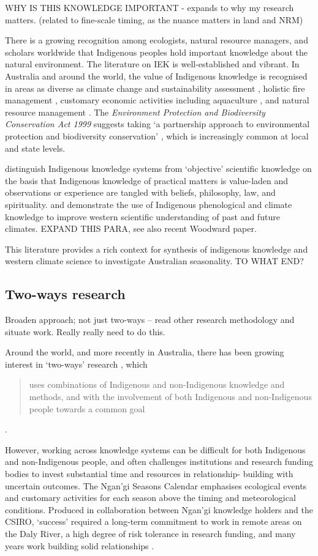 WHY IS THIS KNOWLEDGE IMPORTANT - expands to why my research matters.
(related to fine-scale timing, as the nuance matters in land and NRM)

There is a growing recognition among ecologists, natural resource managers, and
scholars worldwide that Indigenous peoples hold important knowledge about the
natural environment. The literature on IEK is well-established and vibrant.  In
Australia and around the world, the value of Indigenous knowledge is recognised
in areas as diverse as climate change and sustainability assessment
\citep[eg.][]{cochran2015}, holistic fire management \citep[eg.][]{clarke2009,price2012},
customary economic activities including aquaculture \citep{woodward2012a}, and
natural resource management \citep[eg.][]{prober2011}.  The \textit{Environment
Protection and Biodiversity Conservation Act 1999} suggests taking `a
partnership approach to environmental protection and biodiversity conservation'
\citep{ens2012}, which is increasingly common at local and state levels.

\citet{turner2009} distinguish Indigenous knowledge systems from `objective'
scientific knowledge on the basis that Indigenous knowledge of practical
matters is value-laden and observations or experience are tangled with beliefs,
philosophy, law, and spirituality.  \citet{green2010a} and \citet{clarke2009}
demonstrate the use of Indigenous phenological and climate knowledge to improve
western scientific understanding of past and future climates.
EXPAND THIS PARA, see also recent Woodward paper.

This literature provides a rich context for synthesis of indigenous knowledge
and western climate science to investigate Australian seasonality.
TO WHAT END?



\subsection{Two-ways research}
Broaden approach; not just two-ways – read other research methodology and
situate work.  Really really need to do this.

Around the world, and more recently in Australia, there has been growing
interest in `two-ways' research \citep{turner2009,prober2011},
which \blockquote{uses combinations of Indigenous and non-Indigenous knowledge and
methods, and with the involvement of both Indigenous and non-Indigenous people
towards a common goal} \citep{ens2014}.

However, working across knowledge systems can be difficult for both Indigenous
and non-Indigenous people, and often challenges institutions and research
funding bodies to invest substantial time and resources in relationship-
building with uncertain outcomes.  The Ngan'gi Seasons Calendar emphasises
ecological events and customary activities for each season above the timing and
meteorological conditions.  Produced in collaboration between Ngan'gi knowledge
holders and the CSIRO, `success' required a long-term commitment to work in
remote areas on the Daly River, a high degree of risk tolerance in
research funding, and many years work building solid relationships \citep{woodward2010}.

